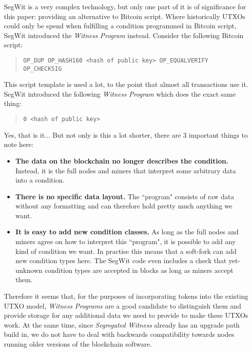 \documentclass{article}
\begin{document}
SegWit is a very complex technology, but only one part of it is of significance for this paper: providing an alternative to Bitcoin script. Where historically UTXOs could only be spend when fulfilling a condition programmed in Bitcoin script, SegWit introduced the \emph{Witness Program} instead. Consider the following Bitcoin script:

\begin{quote}
    \texttt{OP\_DUP OP\_HASH160 <hash of public key> OP\_EQUALVERIFY OP\_CHECKSIG}
\end{quote}

This script template is used a lot, to the point that almost all transactions use it. SegWit introduced the following \emph{Witness Program} which does the exact same thing:

\begin{quote}
    \texttt{0 <hash of public key>}
\end{quote}

Yes, that is it... But not only is this a lot shorter, there are 3 important things to note here:

\begin{itemize}
    \item \textbf{The data on the blockchain no longer describes the condition.} Instead, it is the full nodes and miners that interpret some arbitrary data into a condition.
    \item \textbf{There is no specific data layout.} The ``program" consists of raw data without any formatting and can therefore hold pretty much anything we want.
    \item \textbf{It is easy to add new condition classes.} As long as the full nodes and miners agree on how to interpret this ``program", it is possible to add any kind of condition we want. In practise this means that a soft-fork can add new condition types here. The SegWit code even includes a check that yet-unknown condition types are accepted in blocks as long as miners accept them.
\end{itemize}

Therefore it seems that, for the purposes of incorporating tokens into the existing UTXO model, \emph{Witness Programs} are a good candidate to distinguish them and provide storage for any additional data we need to provide to make these UTXOs work. At the same time, since \emph{Segregated Witness} already has an upgrade path build in, we do not have to deal with backwards compatibility towards nodes running older versions of the blockchain software.
\end{document}
